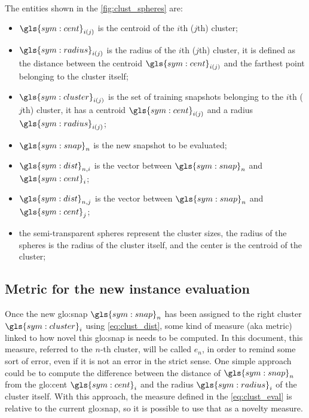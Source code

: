 \paragraph*{}
The entities shown in the \autoref{fig:clust_spheres} are:
\begin{itemize}
  \item $\gls{sym:cent}_{i(j)}$ is the centroid of the $i$th ($j$th) cluster;
  \item $\gls{sym:radius}_{i(j)}$ is the radius of the $i$th ($j$th) cluster, it is defined as the distance between the centroid $\gls{sym:cent}_{i(j)}$ and the farthest point belonging to the cluster itself;
  \item $\gls{sym:cluster}_{i(j)}$ is the set of training snapshots belonging to the $i$th ($j$th) cluster, it has a centroid $\gls{sym:cent}_{i(j)}$ and a radius $\gls{sym:radius}_{i(j)}$;
  \item $\gls{sym:snap}_n$ is the new snapshot to be evaluated;
  \item $\gls{sym:dist}_{n,i}$ is the vector between $\gls{sym:snap}_n$ and $\gls{sym:cent}_i$;
  \item $\gls{sym:dist}_{n,j}$ is the vector between $\gls{sym:snap}_n$ and $\gls{sym:cent}_j$;
  \item the semi-transparent spheres represent the cluster sizes, the radius of the spheres is the radius of the cluster itself, and the center is the centroid of the cluster;
\end{itemize}



\subsection{Metric for the new instance evaluation}
\label{sec:clust_metric}
Once the new {\gls{glo:snap}} $\gls{sym:snap}_n$ has been assigned to the right cluster $\gls{sym:cluster}_i$ using \autoref{eq:clust_dist}, some kind of measure (\gls{aka} metric) linked to how novel this {\gls{glo:snap}} is needs to be computed. In this document, this measure, referred to the $n$-th cluster, will be called $e_n$, in order to remind some sort of error, even if it is not an error in the strict sense. One simple approach could be to compute the difference between the distance of $\gls{sym:snap}_n$ from the {\gls{glo:cent}} $\gls{sym:cent}_i$ and the radius $\gls{sym:radius}_i$ of the cluster itself. With this approach, the measure defined in the \autoref{eq:clust_eval} is relative to the current {\gls{glo:snap}}, so it is possible to use that as a novelty measure.

